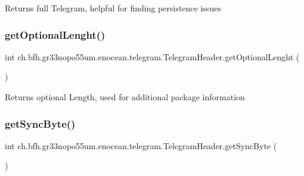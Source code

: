 \begin{DoxyReturn}{Returns}
full Telegram, helpful for finding persistence issues 
\end{DoxyReturn}
\hypertarget{classch_1_1bfh_1_1gr33nopo55um_1_1enocean_1_1telegram_1_1_telegram_header_a6aa37ad4cb093b505a528c1f228397a7}{}\label{classch_1_1bfh_1_1gr33nopo55um_1_1enocean_1_1telegram_1_1_telegram_header_a6aa37ad4cb093b505a528c1f228397a7} 
\subsubsection{\texorpdfstring{get\+Optional\+Lenght()}{getOptionalLenght()}}
{\footnotesize\ttfamily int ch.\+bfh.\+gr33nopo55um.\+enocean.\+telegram.\+Telegram\+Header.\+get\+Optional\+Lenght (\begin{DoxyParamCaption}{ }\end{DoxyParamCaption})}

\begin{DoxyReturn}{Returns}
optional Length, used for additional package information 
\end{DoxyReturn}
\hypertarget{classch_1_1bfh_1_1gr33nopo55um_1_1enocean_1_1telegram_1_1_telegram_header_a5fa63d5b376c0dd3ca9163f3b659aef7}{}\label{classch_1_1bfh_1_1gr33nopo55um_1_1enocean_1_1telegram_1_1_telegram_header_a5fa63d5b376c0dd3ca9163f3b659aef7} 
\subsubsection{\texorpdfstring{get\+Sync\+Byte()}{getSyncByte()}}
{\footnotesize\ttfamily int ch.\+bfh.\+gr33nopo55um.\+enocean.\+telegram.\+Telegram\+Header.\+get\+Sync\+Byte (\begin{DoxyParamCaption}{ }\end{DoxyParamCaption})}

